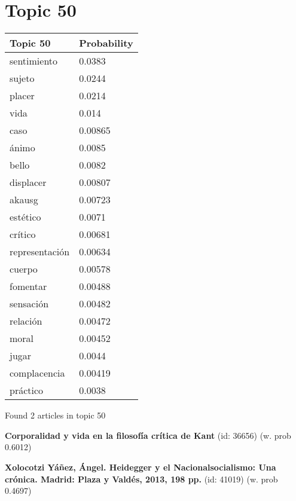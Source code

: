\documentclass{article}
\begin{document}
\section*{Topic 50}\vfill
\begin{tabular}{ll}
\toprule
       Topic 50 & Probability \\
\midrule
    sentimiento &      0.0383 \\
         sujeto &      0.0244 \\
         placer &      0.0214 \\
           vida &       0.014 \\
           caso &     0.00865 \\
          ánimo &      0.0085 \\
          bello &      0.0082 \\
      displacer &     0.00807 \\
         akausg &     0.00723 \\
       estético &      0.0071 \\
        crítico &     0.00681 \\
 representación &     0.00634 \\
         cuerpo &     0.00578 \\
       fomentar &     0.00488 \\
      sensación &     0.00482 \\
       relación &     0.00472 \\
          moral &     0.00452 \\
          jugar &      0.0044 \\
   complacencia &     0.00419 \\
       práctico &      0.0038 \\
\bottomrule
\end{tabular}

\vfill
Found 2 articles in topic 50
\vfill

\textbf{Corporalidad y vida en la filosofía crítica de Kant} (id: 36656)
 (w. prob 0.6012)
\vfill

\textbf{Xolocotzi Yáñez, Ángel. Heidegger y el Nacionalsocialismo: Una crónica. Madrid: Plaza y Valdés, 2013, 198 pp.} (id: 41019)
 (w. prob 0.4697)

\vfill
\newpage


\centering
\thispagestyle{empty}
\end{document}

